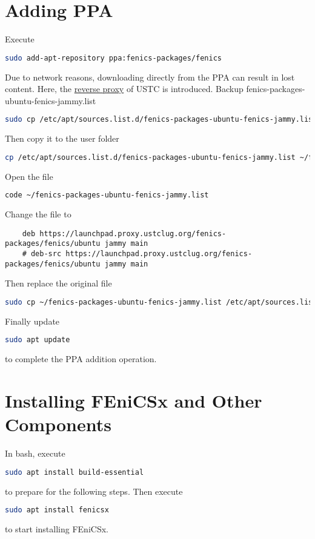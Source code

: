 \documentclass{report}
\begin{document}
\section{Adding PPA}

Execute 
\begin{lstlisting}[language = bash]
	sudo add-apt-repository ppa:fenics-packages/fenics
\end{lstlisting}
Due to network reasons, downloading directly from the PPA can result in lost content. Here, the \href{https://mirrors.ustc.edu.cn/}{reverse proxy} of USTC is introduced. Backup \textsf{fenics-packages-ubuntu-fenics-jammy.list} 
\begin{lstlisting}[language = bash]
	sudo cp /etc/apt/sources.list.d/fenics-packages-ubuntu-fenics-jammy.list /etc/apt/sources.list.d/fenics-packages-ubuntu-fenics-jammy.list.bak
\end{lstlisting}
Then copy it to the user folder
\begin{lstlisting}[language = bash]
	cp /etc/apt/sources.list.d/fenics-packages-ubuntu-fenics-jammy.list ~/fenics-packages-ubuntu-fenics-jammy.list
\end{lstlisting}
Open the file
\begin{lstlisting}[language = bash]
	code ~/fenics-packages-ubuntu-fenics-jammy.list
\end{lstlisting}
Change the file to
\begin{lstlisting}
	deb https://launchpad.proxy.ustclug.org/fenics-packages/fenics/ubuntu jammy main
	# deb-src https://launchpad.proxy.ustclug.org/fenics-packages/fenics/ubuntu jammy main
\end{lstlisting}
Then replace the original file
\begin{lstlisting}[language = bash]
	sudo cp ~/fenics-packages-ubuntu-fenics-jammy.list /etc/apt/sources.list.d/fenics-packages-ubuntu-fenics-jammy.list
\end{lstlisting}
Finally update
\begin{lstlisting}[language = bash]
	sudo apt update
\end{lstlisting}
to complete the PPA addition operation.

\section{Installing FEniCSx and Other Components}

In \textsf{bash}, execute
\begin{lstlisting}[language = bash]
	sudo apt install build-essential
\end{lstlisting}
to prepare for the following steps. Then execute
\begin{lstlisting}[language = bash]
	sudo apt install fenicsx
\end{lstlisting}
to start installing FEniCSx.
\end{document}
